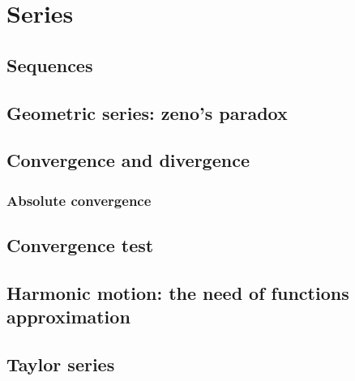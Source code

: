 \chapter{Series}

\section{Sequences}

\section{Geometric series: zeno's paradox}

\section{Convergence and divergence}

\subsection{Absolute convergence}

\section{Convergence test}

\section{Harmonic motion: the need of functions approximation}

\section{Taylor series}